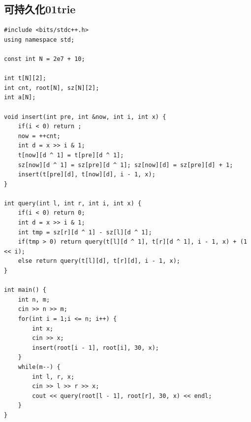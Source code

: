 \documentclass[twoside]{article}
\begin{document}
\subsection{可持久化01trie}
\begin{lstlisting}
#include <bits/stdc++.h>
using namespace std;

const int N = 2e7 + 10;

int t[N][2];
int cnt, root[N], sz[N][2];
int a[N];

void insert(int pre, int &now, int i, int x) {
    if(i < 0) return ;
    now = ++cnt;
    int d = x >> i & 1;
    t[now][d ^ 1] = t[pre][d ^ 1]; 
    sz[now][d ^ 1] = sz[pre][d ^ 1]; sz[now][d] = sz[pre][d] + 1;
    insert(t[pre][d], t[now][d], i - 1, x);
}

int query(int l, int r, int i, int x) {
    if(i < 0) return 0;
    int d = x >> i & 1;
    int tmp = sz[r][d ^ 1] - sz[l][d ^ 1];
    if(tmp > 0) return query(t[l][d ^ 1], t[r][d ^ 1], i - 1, x) + (1 << i);
    else return query(t[l][d], t[r][d], i - 1, x);
}

int main() {
    int n, m;
    cin >> n >> m;
    for(int i = 1;i <= n; i++) {
        int x;
        cin >> x;
        insert(root[i - 1], root[i], 30, x);
    }
    while(m--) {
        int l, r, x;
        cin >> l >> r >> x;
        cout << query(root[l - 1], root[r], 30, x) << endl;
    }
}\end{lstlisting}
\end{document}

